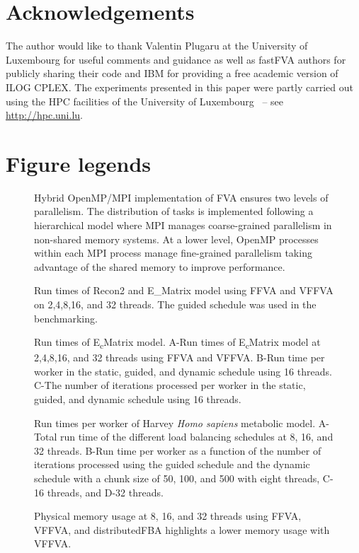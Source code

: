 \section*{Acknowledgements}
The author would like to thank Valentin Plugaru at the University of Luxembourg for useful comments and guidance as well as fastFVA authors for publicly sharing their code and IBM for providing a free academic version of ILOG CPLEX. The experiments presented in this paper were partly carried out
using the HPC facilities of the University of Luxembourg~\cite{VBCG_HPCS14} 
{\small -- see \url{http://hpc.uni.lu}}.

\section*{Figure legends}
\begin{figure}[!htp]
\centering
\caption[Hybrid OpenMP/MPI implementation of FVA.]{Hybrid OpenMP/MPI implementation of FVA ensures two levels of parallelism. The distribution of tasks is implemented following a hierarchical model where MPI manages coarse-grained parallelism in non-shared memory systems. At a lower level, OpenMP processes within each MPI process manage fine-grained parallelism taking advantage of the shared memory to improve performance.}
\label{fig:hybrid.}
\end{figure}

\begin{figure}[!htp]
\centering
\caption[Run times of Recon2 and E\textunderscore Matrix model.]{Run times of Recon2 and E\_Matrix model using FFVA and VFFVA on 2,4,8,16, and 32 threads. The guided schedule was used in the benchmarking.}
\label{fig:largemodel.}
\end{figure}

\begin{figure}[!htp]
\centering
\caption[Run times of E\textsubscript{c}\textunderscore Matrix model.]{Run times of E\textsubscript{c}\textunderscore Matrix model. A-Run times of E\textsubscript{c}\textunderscore Matrix model at 2,4,8,16, and 32 threads using FFVA and VFFVA. B-Run time per worker in the static, guided, and dynamic schedule using 16 threads. C-The number of iterations processed per worker in the static, guided, and dynamic schedule using 16 threads.}
\label{fig:static.}
\end{figure}

\begin{figure}[!htp]
\centering
\caption[Run times per worker of Harvey \textit{Homo sapiens} model.]{Run times per worker of Harvey  \textit{Homo sapiens} metabolic model. A-Total run time of the different load balancing schedules at 8, 16, and 32 threads. B-Run time per worker as a function of the number of iterations processed using the guided schedule and the dynamic schedule with a chunk size of 50, 100, and 500 with eight threads, C-16 threads, and D-32 threads.}
\label{fig:harvey.}
\end{figure}

\begin{figure}[!htp]
\centering
\caption[Physical memory usage at 8, 16, and 32 threads.]{Physical memory usage at 8, 16, and 32 threads using FFVA, VFFVA, and distributedFBA highlights a lower memory usage with VFFVA.}
\label{fig:memory.}
\end{figure}